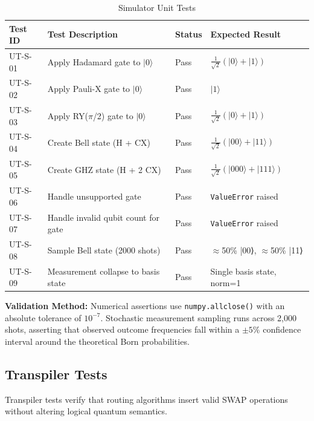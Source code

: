 \begin{table}[h!]
\centering
\caption{Simulator Unit Tests}
\label{tab:sim_tests}
\begin{tabular}{|p{2cm}|p{5cm}|p{2cm}|p{3.5cm}|}
\hline
\textbf{Test ID} & \textbf{Test Description} & \textbf{Status} & \textbf{Expected Result} \\
\hline
UT-S-01 & Apply Hadamard gate to $|0\rangle$ & Pass & $\frac{1}{\sqrt{2}}(|0\rangle + |1\rangle)$ \\
\hline
UT-S-02 & Apply Pauli-X gate to $|0\rangle$ & Pass & $|1\rangle$ \\
\hline
UT-S-03 & Apply RY($\pi$/2) gate to $|0\rangle$ & Pass & $\frac{1}{\sqrt{2}}(|0\rangle + |1\rangle)$ \\
\hline
UT-S-04 & Create Bell state (H + CX) & Pass & $\frac{1}{\sqrt{2}}(|00\rangle + |11\rangle)$ \\
\hline
UT-S-05 & Create GHZ state (H + 2 CX) & Pass & $\frac{1}{\sqrt{2}}(|000\rangle + |111\rangle)$ \\
\hline
UT-S-06 & Handle unsupported gate & Pass & \texttt{ValueError} raised \\
\hline
UT-S-07 & Handle invalid qubit count for gate & Pass & \texttt{ValueError} raised \\
\hline
UT-S-08 & Sample Bell state (2000 shots) & Pass & $\approx$50\% |00⟩, $\approx$50\% |11⟩ \\
\hline
UT-S-09 & Measurement collapse to basis state & Pass & Single basis state, norm=1 \\
\hline
\end{tabular}
\end{table}

\textbf{Validation Method:} Numerical assertions use \texttt{numpy.allclose()} with an absolute tolerance of $10^{-7}$. Stochastic measurement sampling runs across 2,000 shots, asserting that observed outcome frequencies fall within a $\pm 5\%$ confidence interval around the theoretical Born probabilities.

\subsection{Transpiler Tests}
Transpiler tests verify that routing algorithms insert valid SWAP operations without altering logical quantum semantics.

